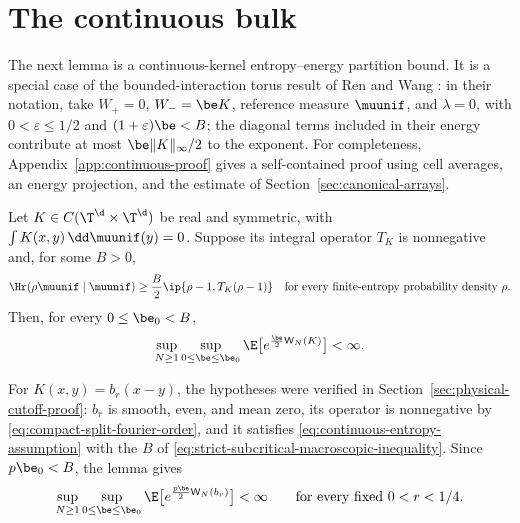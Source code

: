 \section{The continuous bulk}
\label{sec:continuous-localized-reduction}
The next lemma is a continuous-kernel entropy--energy partition bound.  It is a special case of the bounded-interaction torus result of Ren and Wang \cite[Corollary~4 and Remark~3]{RenWang2025}: in their notation, take $W_+=0$, $W_-=\be K$, reference measure $\muunif$, and $\lambda=0$, with $0<\varepsilon\le1/2$ and $(1+\varepsilon)\be<B$; the diagonal terms included in their energy contribute at most $\be\|K\|_\infty/2$ to the exponent.  For completeness, Appendix~\ref{app:continuous-proof} gives a self-contained proof using cell averages, an energy projection, and the estimate of Section~\ref{sec:canonical-arrays}.

\begin{lemma}
\label{lem:continuous-entropy-partition}
Let $K\in C(\T^\d\times\T^\d)$ be real and symmetric, with $\int K(x,y)\,\dd\muunif(y)=0$.  Suppose its integral operator $T_K$ is nonnegative and, for some $B>0$,
\begin{equation}
 \Hr(\rho\muunif\mid\muunif)
 \ge\frac B2\ip{\rho-1,T_K(\rho-1)}
 \quad\text{for every finite-entropy probability density }\rho.
 \label{eq:continuous-entropy-assumption}
\end{equation}
Then, for every $0\le\be_0<B$,
\begin{equation}
 \sup_{N\ge1}\sup_{0\le\be\le\be_0}
 \E\big[e^{\frac\be2\mathsf W_N(K)}\big]<\infty.
 \label{eq:continuous-partition-conclusion}
\end{equation}
\end{lemma}

For $K(x,y)=b_r(x-y)$, the hypotheses were verified in Section~\ref{sec:physical-cutoff-proof}: $b_r$ is smooth, even, and mean zero, its operator is nonnegative by \eqref{eq:compact-split-fourier-order}, and it satisfies \eqref{eq:continuous-entropy-assumption} with the $B$ of \eqref{eq:strict-subcritical-macroscopic-inequality}.  Since $p\be_0<B$, the lemma gives
\begin{equation}
 \sup_{N\ge1}\sup_{0\le\be\le\be_0}
 \E\big[e^{\frac{p\be}{2}\mathsf W_N(b_r)}\big]<\infty
 \qquad\text{for every fixed }0<r<1/4.
 \label{eq:physical-continuous-bulk-bound}
\end{equation}
